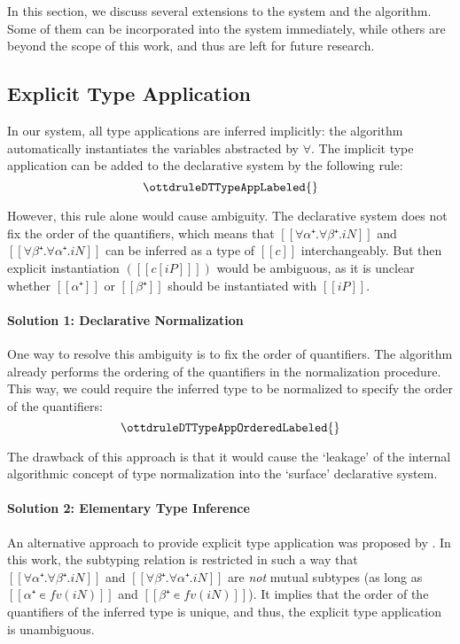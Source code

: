 \label{sec:extensions}

In this section, we discuss several extensions to the system and the algorithm.
Some of them can be incorporated into the system immediately, while others
are beyond the scope of this work, and thus are left for future research.

\subsection{Explicit Type Application}
\label{sec:explicit-type-application}

In our system, all type applications are inferred implicitly: the algorithm
automatically instantiates the variables abstracted by $\forall$. 
The implicit type application can be added to the declarative system by the following rule:
$$\ottdruleDTTypeAppLabeled{}$$

However, this rule alone would cause ambiguity.
The declarative system does not fix the order of the quantifiers, 
which means that $[[∀α⁺.∀β⁺.iN]]$ and $[[∀β⁺.∀α⁺.iN]]$ can be inferred 
as a type of $[[c]]$ interchangeably. But then explicit instantiation
$([[ c[iP] ]])$ would be ambiguous, as it is unclear whether $[[α⁺]]$ or
$[[β⁺]]$ should be instantiated with $[[iP]]$.

\paragraph{Solution 1: Declarative Normalization}
One way to resolve this ambiguity is to fix the order of quantifiers.  
The algorithm already performs the ordering of the quantifiers in the normalization procedure.
This way, we could require the inferred type to be normalized
to specify the order of the quantifiers:
$$\ottdruleDTTypeAppOrderedLabeled{}$$

The drawback of this approach is that it 
would cause the `leakage' of the internal algorithmic 
concept of type normalization into the `surface' declarative 
system. 

\paragraph{Solution 2: Elementary Type Inference}
An alternative approach to provide explicit type application
 was proposed by \cite{zhao22:elementary}.
In this work, the subtyping relation is restricted 
in such a way that 
$[[∀α⁺.∀β⁺.iN]]$ and $[[∀β⁺.∀α⁺.iN]]$ are \emph{not} mutual subtypes 
(as long as $[[α⁺ ∊ fv(iN)]]$ and $[[β⁺ ∊ fv(iN)]]$).
It implies that the order of the quantifiers of the inferred type is unique,
and thus, the explicit type application is unambiguous.

